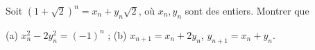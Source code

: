 Soit $(1 + \sqrt{2})^n = x_n + y_n\sqrt{2}$, où $x_n, y_n$ sont des entiers. Montrer que

(a) $x_n^2 - 2y_n^2 = (-1)^n$ ; (b) $x_{n+1} = x_n + 2y_n$, $y_{n+1} = x_n + y_n$.

